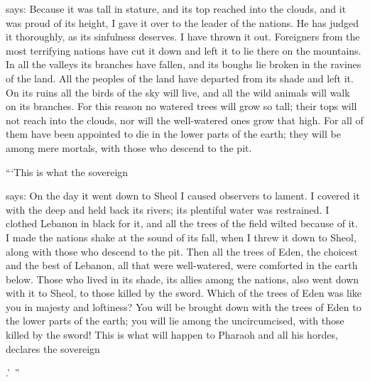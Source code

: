 {{}
says: Because
it
was tall
in stature,
and its top reached into the clouds, and it was proud
of its height,
I gave
it over
to the leader
of the nations.
He has
judged it thoroughly, as its sinfulness
deserves. I have thrown it out.
Foreigners
from the most terrifying
nations
have
cut
it down
and left it to
lie
there on the mountains.
In all
the valleys
its branches
have fallen,
and its boughs
lie broken
in the ravines
of the land.
All
the peoples
of the land
have departed
from its shade and left it.
On
its ruins
all
the birds
of the sky
will live,
and all
the wild
animals
will walk on its branches.
For
this reason no
watered
trees
will grow
so tall;
their tops
will not
reach
into the clouds, nor will the well-watered
ones
grow that high.
For
all
of them
have been appointed
to
die
in the lower
parts of the earth;
they will be among
mere mortals,
with those who descend
to
the pit.
\par }{\PP {}“‘This is what
the sovereign

{}
says: On the day
it went down
to Sheol
I caused observers to lament.
I covered
it with the deep
and held back
its rivers;
its plentiful
water
was restrained.
I clothed Lebanon
in
black
for it, and all
the trees
of the field
wilted
because of it.
I made the nations
shake
at the sound
of its fall,
when I threw it down
to Sheol,
along with
those who descend
to the pit.
Then
all
the trees
of Eden,
the choicest
and the best
of Lebanon,
all
that were well-watered,
were comforted
in the earth
below.
Those
who lived
in its shade,
its allies
among
the nations,
also
went down
with it to Sheol,
to
those killed
by the sword.
Which
of the trees
of Eden
was like
you in majesty
and loftiness? You will be brought down
with
the trees
of Eden
to
the lower
parts of the earth;
you will lie
among
the uncircumcised,
with
those killed
by the sword! This is
what will happen to Pharaoh
and all
his hordes,
declares
the sovereign

{}.’ ”

\par }
